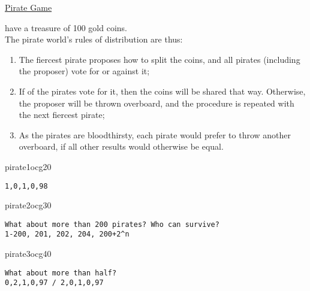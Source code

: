 \documentclass[UTF8,11pt,colorlinks,compress,openany]{beamer}%
\begin{document}
\begin{frame}[fragile]{\href{https://mp.weixin.qq.com/s/LLUoU0gl3t6GTh6jDef5vA}{Pirate Game}}
	\begin{problem}
		 have a treasure of 100 gold coins.\\
		The pirate world's rules of distribution are thus:
		\begin{enumerate}
			\item The fiercest pirate proposes how to split the coins, and all pirates (including the proposer) vote for or against it;
			\item If  of the pirates vote for it, then the coins will be shared that way. Otherwise, the proposer will be thrown overboard, and the procedure is repeated with the next fiercest pirate;
			\item As the pirates are bloodthirsty, each pirate would prefer to throw another overboard, if all other results would otherwise be equal.
		\end{enumerate}
	\end{problem}
\begin{ocg}{pirate1}{ocg2}{0}
\begin{verbatim}
1,0,1,0,98
\end{verbatim}
\end{ocg}
\begin{ocg}{pirate2}{ocg3}{0}
\begin{verbatim}
What about more than 200 pirates? Who can survive?
1-200, 201, 202, 204, 200+2^n
\end{verbatim}
\end{ocg}
\begin{ocg}{pirate3}{ocg4}{0}
\begin{verbatim}
What about more than half?
0,2,1,0,97 / 2,0,1,0,97
\end{verbatim}
\end{ocg}
\end{frame}
\end{document}
